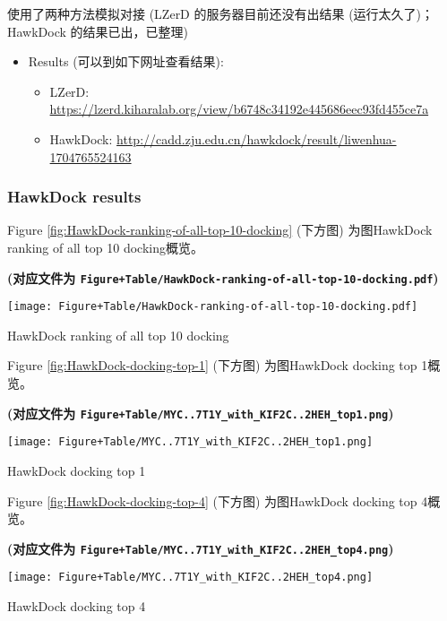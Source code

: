 \documentclass[
]{article}
\providecommand{\tightlist}{%
  \setlength{\itemsep}{0pt}\setlength{\parskip}{0pt}}
\begin{document}
使用了两种方法模拟对接 (LZerD 的服务器目前还没有出结果 (运行太久了)；HawkDock 的结果已出，已整理)

\begin{itemize}
\tightlist
\item
  Results (可以到如下网址查看结果):

  \begin{itemize}
  \tightlist
  \item
    LZerD: \url{https://lzerd.kiharalab.org/view/b6748c34192e445686eec93fd455ce7a}
  \item
    HawkDock: \url{http://cadd.zju.edu.cn/hawkdock/result/liwenhua-1704765524163}
  \end{itemize}
\end{itemize}

\hypertarget{hawkdock-results}{%
\subsubsection{HawkDock results}\label{hawkdock-results}}

Figure \ref{fig:HawkDock-ranking-of-all-top-10-docking} (下方图) 为图HawkDock ranking of all top 10 docking概览。

\textbf{(对应文件为 \texttt{Figure+Table/HawkDock-ranking-of-all-top-10-docking.pdf})}

\def\@captype{figure}
\begin{center}
\texttt{[image: Figure+Table/HawkDock-ranking-of-all-top-10-docking.pdf]}
\caption{HawkDock ranking of all top 10 docking}\label{fig:HawkDock-ranking-of-all-top-10-docking}
\end{center}

Figure \ref{fig:HawkDock-docking-top-1} (下方图) 为图HawkDock docking top 1概览。

\textbf{(对应文件为 \texttt{Figure+Table/MYC..7T1Y\_with\_KIF2C..2HEH\_top1.png})}

\def\@captype{figure}
\begin{center}
\texttt{[image: Figure+Table/MYC..7T1Y\_with\_KIF2C..2HEH\_top1.png]}
\caption{HawkDock docking top 1}\label{fig:HawkDock-docking-top-1}
\end{center}

Figure \ref{fig:HawkDock-docking-top-4} (下方图) 为图HawkDock docking top 4概览。

\textbf{(对应文件为 \texttt{Figure+Table/MYC..7T1Y\_with\_KIF2C..2HEH\_top4.png})}

\def\@captype{figure}
\begin{center}
\texttt{[image: Figure+Table/MYC..7T1Y\_with\_KIF2C..2HEH\_top4.png]}
\caption{HawkDock docking top 4}\label{fig:HawkDock-docking-top-4}
\end{center}
\end{document}

